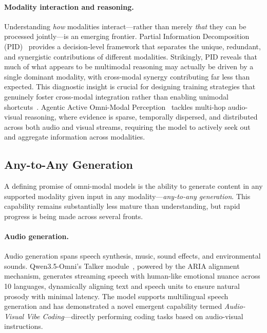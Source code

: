 \documentclass{article}
\begin{document}
\paragraph{Modality interaction and reasoning.}
Understanding \emph{how} modalities interact---rather than merely \emph{that} they can be processed jointly---is an emerging frontier.
Partial Information Decomposition (PID)~\cite{placeholder2026pid} provides a decision-level framework that separates the unique, redundant, and synergistic contributions of different modalities.
Strikingly, PID reveals that much of what appears to be multimodal reasoning may actually be driven by a single dominant modality, with cross-modal synergy contributing far less than expected.
This diagnostic insight is crucial for designing training strategies that genuinely foster cross-modal integration rather than enabling unimodal shortcuts~\cite{placeholder2026stagedposttraining}.
Agentic Active Omni-Modal Perception~\cite{placeholder2026agenticperception} tackles multi-hop audio-visual reasoning, where evidence is sparse, temporally dispersed, and distributed across both audio and visual streams, requiring the model to actively seek out and aggregate information across modalities.

\subsection{Any-to-Any Generation}

A defining promise of omni-modal models is the ability to generate content in any supported modality given input in any modality---\emph{any-to-any generation}.
This capability remains substantially less mature than understanding, but rapid progress is being made across several fronts.

\paragraph{Audio generation.}
Audio generation spans speech synthesis, music, sound effects, and environmental sounds.
Qwen3.5-Omni's Talker module~\cite{qwen2026omni}, powered by the ARIA alignment mechanism, generates streaming speech with human-like emotional nuance across 10 languages, dynamically aligning text and speech units to ensure natural prosody with minimal latency.
The model supports multilingual speech generation and has demonstrated a novel emergent capability termed \emph{Audio-Visual Vibe Coding}---directly performing coding tasks based on audio-visual instructions.
\end{document}
